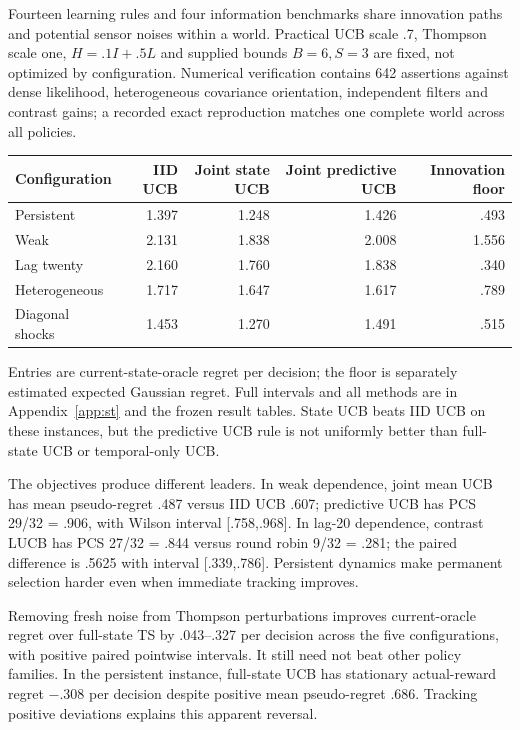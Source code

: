 Fourteen learning rules and four information benchmarks share innovation paths and potential sensor noises within a world. Practical UCB scale .7, Thompson scale one, $H=.1I+.5L$ and supplied bounds $B=6,S=3$ are fixed, not optimized by configuration. Numerical verification contains 642 assertions against dense likelihood, heterogeneous covariance orientation, independent filters and contrast gains; a recorded exact reproduction matches one complete world across all policies.

\begin{center}\small
\begin{tabular}{lrrrr}
\toprule
Configuration & IID UCB & Joint state UCB & Joint predictive UCB & Innovation floor \\
\midrule
Persistent & 1.397 & 1.248 & 1.426 & .493 \\
Weak & 2.131 & 1.838 & 2.008 & 1.556 \\
Lag twenty & 2.160 & 1.760 & 1.838 & .340 \\
Heterogeneous & 1.717 & 1.647 & 1.617 & .789 \\
Diagonal shocks & 1.453 & 1.270 & 1.491 & .515 \\
\bottomrule
\end{tabular}\end{center}
Entries are current-state-oracle regret per decision; the floor is separately estimated expected Gaussian regret. Full intervals and all methods are in Appendix~\ref{app:st} and the frozen result tables. State UCB beats IID UCB on these instances, but the predictive UCB rule is not uniformly better than full-state UCB or temporal-only UCB.

The objectives produce different leaders. In weak dependence, joint mean UCB has mean pseudo-regret .487 versus IID UCB .607; predictive UCB has PCS 29/32 = .906, with Wilson interval [.758,.968]. In lag-20 dependence, contrast LUCB has PCS 27/32 = .844 versus round robin 9/32 = .281; the paired difference is .5625 with interval [.339,.786]. Persistent dynamics make permanent selection harder even when immediate tracking improves.

Removing fresh noise from Thompson perturbations improves current-oracle regret over full-state TS by .043--.327 per decision across the five configurations, with positive paired pointwise intervals. It still need not beat other policy families. In the persistent instance, full-state UCB has stationary actual-reward regret $-.308$ per decision despite positive mean pseudo-regret .686. Tracking positive deviations explains this apparent reversal.

